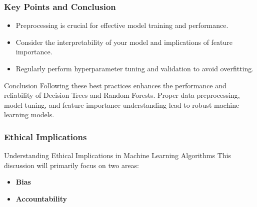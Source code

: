 \documentclass[aspectratio=169]{beamer}
\begin{document}
\begin{frame}
    \frametitle{Key Points and Conclusion}
    \begin{itemize}
        \item Preprocessing is crucial for effective model training and performance.
        \item Consider the interpretability of your model and implications of feature importance.
        \item Regularly perform hyperparameter tuning and validation to avoid overfitting.
    \end{itemize}
    \begin{block}{Conclusion}
        Following these best practices enhances the performance and reliability of Decision Trees and Random Forests. Proper data preprocessing, model tuning, and feature importance understanding lead to robust machine learning models.
    \end{block}
\end{frame}

\begin{frame}[fragile]
    \frametitle{Ethical Implications}
    \begin{block}{Understanding Ethical Implications in Machine Learning Algorithms}
        This discussion will primarily focus on two areas: 
        \begin{itemize}
            \item \textbf{Bias}
            \item \textbf{Accountability}
        \end{itemize}
    \end{block}
\end{frame}
\end{document}
